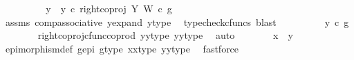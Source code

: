 \begin{isabellebody}
\ \ \ \ \isamarkupfalse%
\ \isamarkupfalse%
\ {\isachardoublequoteopen}{\isachardot}{\kern0pt}{\isachardot}{\kern0pt}{\isachardot}{\kern0pt}\ {\isacharequal}{\kern0pt}\ {\isacharparenleft}{\kern0pt}{\isacharparenleft}{\kern0pt}y{}\ {\isasymamalg}\ y{}{\isacharparenright}{\kern0pt}\ {\isasymcirc}\isactrlsub c\ right{\isacharunderscore}{\kern0pt}coproj\ Y\ W{\isacharparenright}{\kern0pt}\ {\isasymcirc}\isactrlsub c\ g{\isachardoublequoteclose}\isanewline
\ \ \ \ \ \ \isamarkupfalse%
\ assms\ comp{\isacharunderscore}{\kern0pt}associative{}\ y{\isacharunderscore}{\kern0pt}expand\ y{\isacharunderscore}{\kern0pt}type\ \isamarkupfalse%
\ {\isacharparenleft}{\kern0pt}typecheck{\isacharunderscore}{\kern0pt}cfuncs{\isacharcomma}{\kern0pt}\ blast{\isacharparenright}{\kern0pt}\isanewline
\ \ \ \ \isamarkupfalse%
\ \isamarkupfalse%
\ {\isachardoublequoteopen}{\isachardot}{\kern0pt}{\isachardot}{\kern0pt}{\isachardot}{\kern0pt}\ {\isacharequal}{\kern0pt}\ y{}\ {\isasymcirc}\isactrlsub c\ g{\isachardoublequoteclose}\isanewline
\ \ \ \ \ \ \isamarkupfalse%
\ right{\isacharunderscore}{\kern0pt}coproj{\isacharunderscore}{\kern0pt}cfunc{\isacharunderscore}{\kern0pt}coprod\ y{}{\isacharunderscore}{\kern0pt}y{}{\isacharunderscore}{\kern0pt}type{\isacharparenleft}{\kern0pt}{}{\isacharparenright}{\kern0pt}\ y{}{\isacharunderscore}{\kern0pt}y{}{\isacharunderscore}{\kern0pt}type{\isacharparenleft}{\kern0pt}{}{\isacharparenright}{\kern0pt}\ \isamarkupfalse%
\ auto\isanewline
\ \ \ \ \isamarkupfalse%
\ \isamarkupfalse%
\ {\isachardoublequoteopen}x{}\ {\isacharequal}{\kern0pt}\ y{}{\isachardoublequoteclose}\isanewline
\ \ \ \ \ \ \isamarkupfalse%
\ epimorphism{\isacharunderscore}{\kern0pt}def{}\ g{\isacharunderscore}{\kern0pt}epi\ g{\isacharunderscore}{\kern0pt}type\ x{}{\isacharunderscore}{\kern0pt}x{}{\isacharunderscore}{\kern0pt}type{\isacharparenleft}{\kern0pt}{}{\isacharparenright}{\kern0pt}\ y{}{\isacharunderscore}{\kern0pt}y{}{\isacharunderscore}{\kern0pt}type{\isacharparenleft}{\kern0pt}{}{\isacharparenright}{\kern0pt}\ \isamarkupfalse%
\ fastforce\isanewline
\ \ \isamarkupfalse%
\isanewline
\ \ \isamarkupfalse%
\ \isamarkupfalse%

\end{isabellebody}
